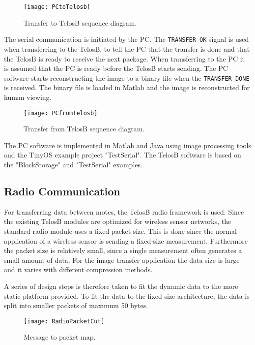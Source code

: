 \begin{figure}[H]
	\centering
	\texttt{[image: PCtoTelosb]}
	\caption{Transfer to TelosB sequence diagram.}
	\label{transfertotelos}
\end{figure}

The serial communication is initiated by the PC.
The \texttt{TRANSFER\_OK} signal is used when transferring to the TelosB, to tell the PC that the transfer is done and that the TelosB is ready to receive the next package.
When transferring to the PC it is assumed that the PC is ready before the TelosB starts sending.
The PC software starts reconstructing the image to a binary file when the \texttt{TRANSFER\_DONE} is received.
The binary file is loaded in Matlab and the image is reconstructed for human viewing.
\begin{figure}[H]
	\centering
	\texttt{[image: PCfromTelosb]}
	\caption{Transfer from TelosB sequence diagram.}
	\label{transferfromtelos}
\end{figure}
The PC software is implemented in Matlab and Java using image processing tools and the TinyOS example project "TestSerial".
The TelosB software is based on the "BlockStorage" and "TestSerial" examples.


\subsection{Radio Communication}\label{sec:Radio-Block}

For transferring data between motes, the TelosB radio framework is used. 
Since the existing TelosB modules are optimized for wireless sensor networks, the standard radio module uses a fixed packet size. 
This is done since the normal application of a wireless sensor is sending a fixed-size measurement. 
Furthermore the packet size is relatively small, since a single measurement often generates a small amount of data. 
For the image transfer application the data size is large and it varies with different compression methods.

A series of design steps is therefore taken to fit the dynamic data to the more static platform provided. 
To fit the data to the fixed-size architecture, the data is split into smaller packets of maximum 50 bytes. 

\begin{figure}[H]
	\centering
	\texttt{[image: RadioPacketCut]}
	\caption{Message to packet map.}
	\label{fig:RadioPacketCut}
\end{figure}

